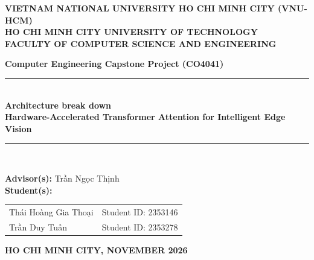 \documentclass[12pt,a4paper]{report}
\begin{document}
\begin{titlepage}
\begin{center}
    {\large \textbf{VIETNAM NATIONAL UNIVERSITY HO CHI MINH CITY (VNU-HCM)}}\\[3pt]
    {\large \textbf{HO CHI MINH CITY UNIVERSITY OF TECHNOLOGY}}\\[3pt]
    {\large \textbf{FACULTY OF COMPUTER SCIENCE AND ENGINEERING}}\\[25pt]

    \vspace{10pt}
    \vspace{25pt}

    {\Large \textbf{Computer Engineering Capstone Project (CO4041)}}\\[15pt]
    \rule{\linewidth}{1.2pt}\\[18pt]

    {\large \textbf{Architecture break down}}\\[12pt]
    {\LARGE \textbf{Hardware-Accelerated Transformer Attention for Intelligent Edge Vision}}\\[18pt]
    \rule{\linewidth}{1.2pt}\\[35pt]

    \begin{minipage}{0.85\linewidth}
        \textbf{Advisor(s):} Trần Ngọc Thịnh\\[8pt]
        \textbf{Student(s):} 
        \begin{tabular}[t]{ll}
            Thái Hoàng Gia Thoại & Student ID: 2353146\\
            Trần Duy Tuấn        & Student ID: 2353278
        \end{tabular}
    \end{minipage}

    \vfill
    {\large \textbf{HO CHI MINH CITY, NOVEMBER 2026}}
\end{center}
\end{titlepage}
\end{document}
